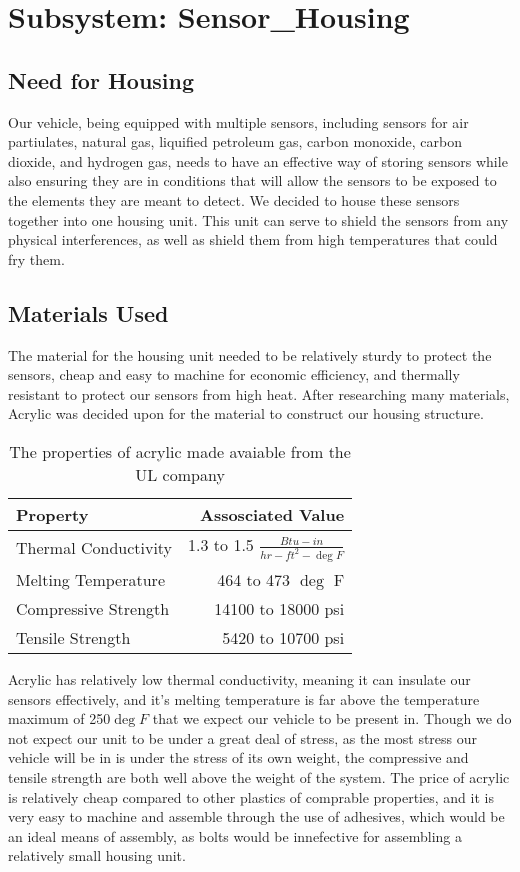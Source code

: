 \chapter{Subsystem: Sensor\_Housing}

\section{Need for Housing} Our vehicle, being equipped with multiple sensors, including sensors for air partiulates, natural gas, liquified petroleum gas, carbon monoxide, carbon dioxide, and hydrogen gas, needs to have an effective way of storing sensors while also ensuring they are in conditions that will allow the sensors to be exposed to the elements they are meant to detect. We decided to house these sensors together into one housing unit. This unit can serve to shield the sensors from any physical interferences, as well as shield them from high temperatures that could fry them.

\section{Materials Used} The material for the housing unit needed to be relatively sturdy to protect the sensors, cheap and easy to machine for economic efficiency, and thermally resistant to protect our sensors from high heat. After researching many materials, Acrylic was decided upon for the material to construct our housing structure.

\begin{table}
\centering
\begin{tabular}{l|r}
Property & Assosciated Value \\\hline
Thermal Conductivity & 1.3 to 1.5 $\frac{Btu-in}{hr-ft^2-\deg F}$ \\
Melting Temperature & 464 to 473 $\deg$ F \\
Compressive Strength & 14100 to 18000 psi \\
Tensile Strength & 5420 to 10700 psi \\
\end{tabular}
\caption{\label{tab:Acrylic Properties} The properties of acrylic made avaiable from the UL company \cite{UL}}
\end{table}

Acrylic has relatively low thermal conductivity, meaning it can insulate our sensors effectively, and it's melting temperature is far above the temperature maximum of 250$\deg F$ that we expect our vehicle to be present in. Though we do not expect our unit to be under a great deal of stress, as the most stress our vehicle will be in is under the stress of its own weight, the compressive and tensile strength are both well above the weight of the system. The price of acrylic is relatively cheap compared to other plastics of comprable properties, and it is very easy to machine and assemble through the use of adhesives, which would be an ideal means of assembly, as bolts would be innefective for assembling a relatively small housing unit.

